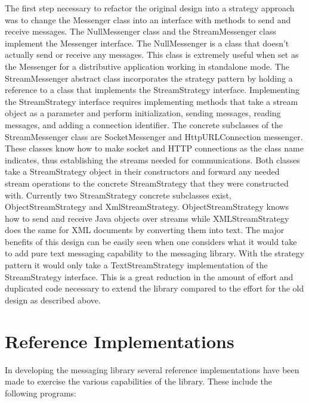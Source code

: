 \documentclass{article}
\begin{document}
The first step necessary to refactor the original design into a
strategy approach was to change the Messenger class into an interface
with methods to send and receive messages.  The NullMessenger class
and the StreamMessenger class implement the Messenger interface.  The
NullMessenger is a class that doesn't actually send or receive any
messages.  This class is extremely useful when set as the Messenger
for a distributive application working in standalone mode.  The
StreamMessenger abstract class incorporates the strategy pattern by
holding a reference to a class that implements the StreamStrategy
interface.  Implementing the StreamStrategy interface requires
implementing methods that take a stream object as a parameter and
perform initialization, sending messages, reading messages, and adding
a connection identifier.  The concrete subclasses of the
StreamMessenger class are SocketMessenger and HttpURLConnection
messenger.  These classes know how to make socket and HTTP connections
as the class name indicates, thus establishing the streams needed for
communications.  Both classes take a StreamStrategy object in their
constructors and forward any needed stream operations to the concrete
StreamStrategy that they were constructed with.  Currently two
StreamStrategy concrete subclasses exist, ObjectStreamStrategy and
XmlStreamStrategy.  ObjectStreamStrategy knows how to send and receive
Java objects over streams while XMLStreamStrategy does the same for
XML documents by converting them into text.  The major benefits of
this design can be easily seen when one considers what it would take to
add pure text messaging capability to the messaging library.  With the
strategy pattern it would only take a TextStreamStrategy
implementation of the StreamStrategy interface.  This is a great
reduction in the amount of effort and duplicated code necessary to
extend the library compared to the effort for the old design as
described above.

\section{Reference Implementations}

In developing the messaging library several reference implementations
have been made to exercise the various capabilities of the library.
These include the following programs:
\end{document}
